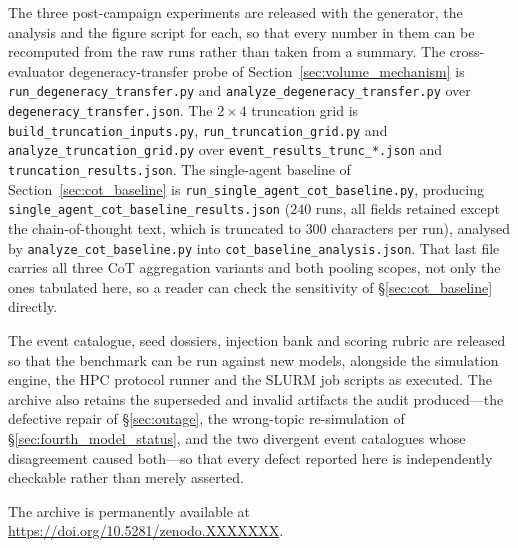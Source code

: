 \documentclass[11pt,journal,onecolumn]{IEEEtran}
\newif\ifecnanonymous
\newcommand{\ecnarchivedoi}{10.5281/zenodo.XXXXXXX}
\newcommand{\ecnarchiveurl}{https://doi.org/\ecnarchivedoi}
\begin{document}
\begin{sloppypar}
The three post-campaign experiments are released with the generator, the analysis and the figure script for each, so that every number in them can be recomputed from the raw runs rather than taken from a summary. The cross-evaluator degeneracy-transfer probe of Section~\ref{sec:volume_mechanism} is \texttt{run\_\allowbreak degeneracy\_\allowbreak transfer.py} and \texttt{analyze\_\allowbreak degeneracy\_\allowbreak transfer.py} over \texttt{degeneracy\_\allowbreak transfer.json}. The $2\times4$ truncation grid is \texttt{build\_\allowbreak truncation\_\allowbreak inputs.py}, \texttt{run\_\allowbreak truncation\_\allowbreak grid.py} and \texttt{analyze\_\allowbreak truncation\_\allowbreak grid.py} over \texttt{event\_\allowbreak results\_\allowbreak trunc\_*.json} and \texttt{truncation\_\allowbreak results.json}. The single-agent baseline of Section~\ref{sec:cot_baseline} is \texttt{run\_\allowbreak single\_\allowbreak agent\_\allowbreak cot\_\allowbreak baseline.py}, producing \texttt{single\_\allowbreak agent\_\allowbreak cot\_\allowbreak baseline\_\allowbreak results.json} ($240$ runs, all fields retained except the chain-of-thought text, which is truncated to $300$ characters per run), analysed by \texttt{analyze\_\allowbreak cot\_\allowbreak baseline.py} into \texttt{cot\_\allowbreak baseline\_\allowbreak analysis.json}. That last file carries all three CoT aggregation variants and both pooling scopes, not only the ones tabulated here, so a reader can check the sensitivity of \S\ref{sec:cot_baseline} directly.
\end{sloppypar}

The event catalogue, seed dossiers, injection bank and scoring rubric are released so that the benchmark can be run against new models, alongside the simulation engine, the HPC protocol runner and the SLURM job scripts as executed. The archive also retains the superseded and invalid artifacts the audit produced---the defective repair of \S\ref{sec:outage}, the wrong-topic re-simulation of \S\ref{sec:fourth_model_status}, and the two divergent event catalogues whose disagreement caused both---so that every defect reported here is independently checkable rather than merely asserted.

\ifecnanonymous
To preserve anonymity during review, the archive is not linked here; it is available to reviewers through the venue, and the permanent public record will be linked in the camera-ready version.
\else
The archive is permanently available at \url{\ecnarchiveurl}.
\fi
\end{document}
